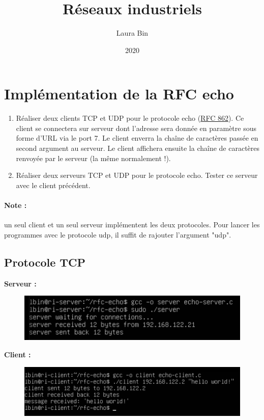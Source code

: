 \documentclass{article}
\title{Réseaux industriels}
\date{2020}
\author{Laura Bin}
\begin{document}

    \pagestyle{fancy}
    \renewcommand\headrulewidth{1pt}
    \fancyhead[R]{\today}

    \section*{Implémentation de la RFC echo}
    \begin{enumerate}
        \item Réaliser deux clients TCP et UDP pour le protocole echo (\href{http://tools.ietf.org/html/rfc862}{RFC 862}). Ce client se connectera sur serveur dont l'adresse sera donnée en paramètre sous forme d'URL via le port 7. Le client enverra la chaîne de caractères passée en second argument au serveur. Le client affichera ensuite la chaîne de caractères renvoyée par le serveur (la même normalement !).
        \item Réaliser deux serveurs TCP et UDP pour le protocole echo. Tester ce serveur avec le client précédent.
    \end{enumerate}

    \paragraph{Note :} un seul client et un seul serveur implémentent les deux protocoles. Pour lancer les programmes avec le protocole udp, il suffit de rajouter l'argument "udp".

    \subsection*{Protocole TCP}
    \textbf{Serveur :}
    \begin{figure}[H]
        \centering
        \includegraphics[width=.65\linewidth]{./screenshots/echo-server-tcp.png}
    \end{figure}

    \textbf{Client :}
    \begin{figure}[H]
        \centering
        \includegraphics[width=.65\linewidth]{./screenshots/echo-client-tcp.png}
    \end{figure}
\end{document}
